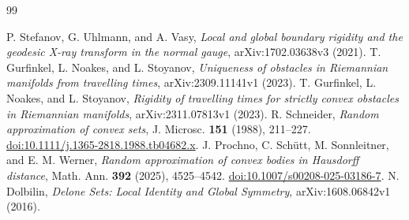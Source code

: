 \begin{thebibliography}{99}
\raggedright
{}
P. Stefanov, G. Uhlmann, and A. Vasy,
\emph{Local and global boundary rigidity and the geodesic X-ray transform
in the normal gauge}, arXiv:1702.03638v3 (2021).
T. Gurfinkel, L. Noakes, and L. Stoyanov,
\emph{Uniqueness of obstacles in Riemannian manifolds from travelling times},
arXiv:2309.11141v1 (2023).
T. Gurfinkel, L. Noakes, and L. Stoyanov,
\emph{Rigidity of travelling times for strictly convex obstacles in
Riemannian manifolds}, arXiv:2311.07813v1 (2023).
R. Schneider, \emph{Random approximation of convex sets},
J. Microsc. \textbf{151} (1988), 211--227.
\href{https://doi.org/10.1111/j.1365-2818.1988.tb04682.x}{doi:10.1111/j.1365-2818.1988.tb04682.x}.
J. Prochno, C. Sch\"utt, M. Sonnleitner, and E. M. Werner,
\emph{Random approximation of convex bodies in Hausdorff distance},
Math. Ann. \textbf{392} (2025), 4525--4542.
\href{https://doi.org/10.1007/s00208-025-03186-7}{doi:10.1007/s00208-025-03186-7}.
N. Dolbilin, \emph{Delone Sets: Local Identity and Global Symmetry},
arXiv:1608.06842v1 (2016).
\end{thebibliography}

